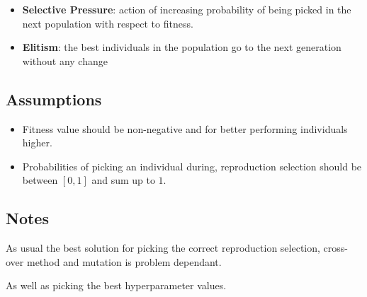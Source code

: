 \documentclass[11pt]{article}
\begin{document}
    \begin{itemize}
        \item \textbf{Selective Pressure}: action of increasing probability of being picked in the next population with respect to fitness.
        \item \textbf{Elitism}: the best individuals in the population go to the next generation without any change 
    \end{itemize}
    
    \subsection{Assumptions}\label{subsec:assumptions}
    
    \begin{itemize}
        \item Fitness value should be non-negative and for better performing individuals higher.
        \item Probabilities of picking an individual during, reproduction selection should be between $[0, 1]$ and sum up to $1$.
    \end{itemize}
    
    \subsection{Notes}\label{subsec:notes}
    
    As usual the best solution for picking the correct reproduction selection, cross-over method and mutation is problem dependant.
    
    As well as picking the best hyperparameter values.
\end{document}
